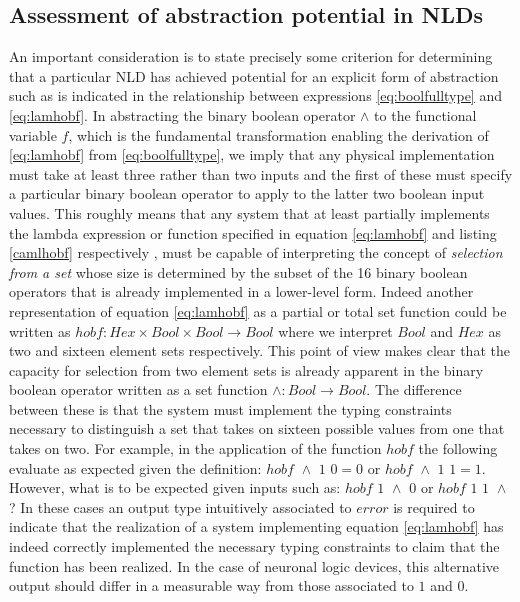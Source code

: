 \subsection{Assessment of abstraction potential in NLDs}
An important consideration is to state precisely some criterion for
determining that a particular NLD has achieved potential for an explicit
form of abstraction such as is indicated in the relationship between
expressions \ref{eq:boolfulltype} and
\ref{eq:lamhobf}. In abstracting the binary boolean
operator $\wedge$ to the functional variable
$f$, which is the fundamental
transformation enabling the derivation of
\ref{eq:lamhobf} from
\ref{eq:boolfulltype}, we imply that any physical
implementation must take at least three rather than two inputs and the
first of these must specify a particular binary boolean operator to
apply to the latter two boolean input values. This roughly means that
any system that at least partially implements the lambda expression or
function specified in equation \ref{eq:lamhobf} and
listing \ref{camlhobf} respectively , must be capable of
interpreting the concept of {\it selection from a set} whose size is
determined by the subset of the 16 binary boolean operators that is
already implemented in a lower-level form. Indeed another representation
of equation \ref{eq:lamhobf} as a partial or total
set function could be written as $hobf : Hex \times Bool \times Bool \rightarrow Bool$
where we interpret $Bool$ and
$Hex$ as two and sixteen element sets
respectively. This point of view makes clear that the capacity for
selection from two element sets is already apparent in the binary
boolean operator written as a set function
$\wedge : Bool \rightarrow Bool$. The difference between these is
that the system must implement the typing constraints necessary to
distinguish a set that takes on sixteen possible values from one that
takes on two. For example, in the application of the function
$hobf$ the following evaluate as expected
given the definition: $hobf \,\, \wedge \,\, 1\,\, 0=0$ or
$hobf \,\, \wedge \,\, 1\,\, 1=1$. However, what is to be expected
given inputs such as: $hobf \,\, 1 \,\, \wedge\,\, 0$ or
$hobf \,\, 1 \,\, 1\,\, \wedge$? In these cases an output type
intuitively associated to $error$ is
required to indicate that the realization of a system implementing
equation \ref{eq:lamhobf} has indeed correctly
implemented the necessary typing constraints to claim that the function
has been realized. In the case of neuronal logic devices, this
alternative output should differ in a measurable way from those
associated to $1$ and $0$.


